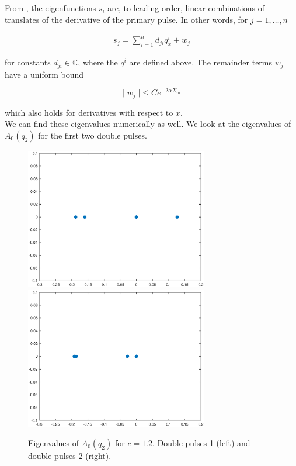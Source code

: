 \documentclass[12pt]{article}
\def\C{{\mathbb C}}
\begin{document}
From \cite{Sandstede1998}, the eigenfunctions $s_i$ are, to leading order, linear combinations of translates of the derivative of the primary pulse. In other words, for $j = 1, \dots, n$

\begin{align}\label{sj}
s_j = \sum_{i = 1}^{n} d_{ji} q^i_x + w_j
\end{align}

for constants $d_{ji} \in \C$, where the $q^i$ are defined above. The remainder terms $w_j$ have a uniform bound

\begin{equation}\label{sjwbound}
||w_j|| \leq C e^{-2 \alpha X_m}
\end{equation}

which also holds for derivatives with respect to $x$.\\

We can find these eigenvalues numerically as well. We look at the eigenvalues of $A_0(q_2)$ for the first two double pulses.

\begin{figure}[H]
\centering
\includegraphics[width=8cm]{specA0d1}
\includegraphics[width=8cm]{specA0d2}
\caption{Eigenvalues of $A_0(q_2)$ for $c = 1.2$. Double pulses 1 (left) and double pulses 2 (right).}
\end{figure}
\end{document}
